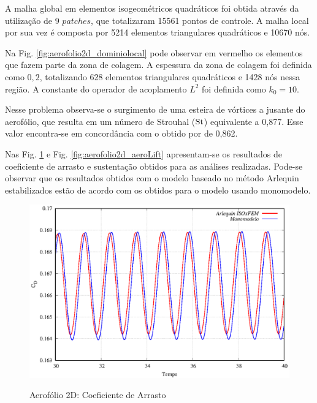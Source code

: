 \documentclass[tese_patricia]{subfiles}
\begin{document}
A malha global em elementos isogeométricos quadráticos foi obtida através da utilização de 9 $patches$, que totalizaram 15561 pontos de controle. A malha local por sua vez é composta por 5214 elementos triangulares quadráticos e 10670 nós. 

Na Fig. \ref{fig:aerofolio2d_dominiolocal} pode observar em vermelho os elementos que fazem parte da zona de colagem. A espessura da zona de colagem foi definida como $0,2$, totalizando 628 elementos triangulares quadráticos e 1428 nós nessa região. A constante do operador de acoplamento $L^{2}$ foi definida como $k_{0} = 10$. 


Nesse problema observa-se o surgimento de uma esteira de vórtices a jusante do aerofólio, que resulta em um número de Strouhal ($\mathrm{St}$) equivalente a 0,877. Esse valor encontra-se em concordância com o obtido por  de 0,862. 

Nas Fig. \ref{fig:aerofolio2d_aeroDrag} e Fig. \ref{fig:aerofolio2d_aeroLift} apresentam-se os resultados de coeficiente de arrasto e sustentação obtidos para as análises realizadas. Pode-se observar que os resultados obtidos com o modelo baseado no método Arlequin estabilizados estão de acordo com os obtidos para o modelo usando monomodelo.


\begin{figure}[htb!]
	\centering 
	{\includegraphics[scale=1.0,trim=0cm 0cm 0cm 0cm, clip=true]{Imagens/Cap6/DragRe.eps}}	
	\caption{Aerofólio 2D: Coeficiente de Arrasto}
	\label{fig:aerofolio2d_aeroDrag}
\end{figure}
\end{document}
